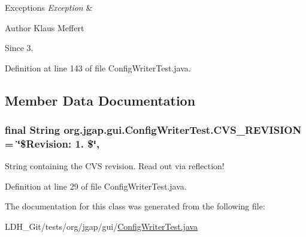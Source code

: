 \begin{DoxyExceptions}{Exceptions}
{\em Exception} & \\
\hline
\end{DoxyExceptions}
\begin{DoxyAuthor}{Author}
Klaus Meffert 
\end{DoxyAuthor}
\begin{DoxySince}{Since}
3. 
\end{DoxySince}


Definition at line 143 of file Config\-Writer\-Test.\-java.



\subsection{Member Data Documentation}
\hypertarget{classorg_1_1jgap_1_1gui_1_1_config_writer_test_a486d40f48be376e04ba0f1c7fb87ddc9}{
\subsubsection[{C\-V\-S\-\_\-\-R\-E\-V\-I\-S\-I\-O\-N}]{\setlength{\rightskip}{0pt plus 5cm}final String org.\-jgap.\-gui.\-Config\-Writer\-Test.\-C\-V\-S\-\_\-\-R\-E\-V\-I\-S\-I\-O\-N = \char`\"{}\$Revision\-: 1. \$\char`\"{}\hspace{0.3cm}{\ttfamily [static]}, {\ttfamily [private]}}}\label{classorg_1_1jgap_1_1gui_1_1_config_writer_test_a486d40f48be376e04ba0f1c7fb87ddc9}
String containing the C\-V\-S revision. Read out via reflection! 

Definition at line 29 of file Config\-Writer\-Test.\-java.



The documentation for this class was generated from the following file\-:\begin{DoxyCompactItemize}
\item 
L\-D\-H\-\_\-\-Git/tests/org/jgap/gui/\hyperlink{_config_writer_test_8java}{Config\-Writer\-Test.\-java}\end{DoxyCompactItemize}
